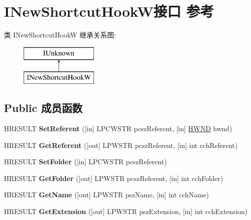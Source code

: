\hypertarget{interface_i_new_shortcut_hook_w}{}\section{I\+New\+Shortcut\+Hook\+W接口 参考}
\label{interface_i_new_shortcut_hook_w}
类 I\+New\+Shortcut\+HookW 继承关系图\+:\begin{figure}[H]
\begin{center}
\leavevmode
\includegraphics[height=2.000000cm]{interface_i_new_shortcut_hook_w}
\end{center}
\end{figure}
\subsection*{Public 成员函数}
\begin{DoxyCompactItemize}
\item 
\mbox{\label{interface_i_new_shortcut_hook_w_aced2885c655a0ae359fb9abfffa4cb82}} 
H\+R\+E\+S\+U\+LT {\bfseries Set\+Referent} (\mbox{[}in\mbox{]} L\+P\+C\+W\+S\+TR pcsz\+Referent, \mbox{[}in\mbox{]} \hyperlink{interfacevoid}{H\+W\+ND} hwnd)
\item 
\mbox{\label{interface_i_new_shortcut_hook_w_a50577a3861fd3f71a4cf520d7feb6fa5}} 
H\+R\+E\+S\+U\+LT {\bfseries Get\+Referent} (\mbox{[}out\mbox{]} L\+P\+W\+S\+TR pcsz\+Referent, \mbox{[}in\mbox{]} int cch\+Referent)
\item 
\mbox{\label{interface_i_new_shortcut_hook_w_a950b28abc7ff81905dd9bfa6be6ec231}} 
H\+R\+E\+S\+U\+LT {\bfseries Set\+Folder} (\mbox{[}in\mbox{]} L\+P\+C\+W\+S\+TR pcsz\+Referent)
\item 
\mbox{\label{interface_i_new_shortcut_hook_w_ad12dfd31d256796118264b3353790a48}} 
H\+R\+E\+S\+U\+LT {\bfseries Get\+Folder} (\mbox{[}out\mbox{]} L\+P\+W\+S\+TR pcsz\+Referent, \mbox{[}in\mbox{]} int cch\+Folder)
\item 
\mbox{\label{interface_i_new_shortcut_hook_w_a0a30e6c07ce87062d82b46eefaad41b8}} 
H\+R\+E\+S\+U\+LT {\bfseries Get\+Name} (\mbox{[}out\mbox{]} L\+P\+W\+S\+TR psz\+Name, \mbox{[}in\mbox{]} int cch\+Name)
\item 
\mbox{\label{interface_i_new_shortcut_hook_w_a82d32a88799c55fe85040eb7737f4350}} 
H\+R\+E\+S\+U\+LT {\bfseries Get\+Extension} (\mbox{[}out\mbox{]} L\+P\+W\+S\+TR psz\+Extension, \mbox{[}in\mbox{]} int cch\+Extension)
\end{DoxyCompactItemize}
